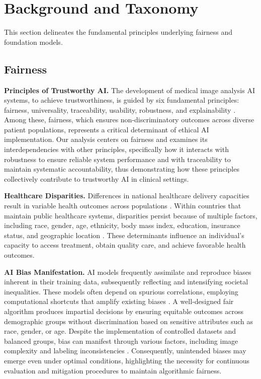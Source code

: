 \section{Background and Taxonomy}
This section delineates the fundamental principles underlying fairness and foundation models.

\subsection{Fairness}
\textbf{Principles of Trustworthy AI.} The development of medical image analysis AI systems, to achieve trustworthiness, is guided by six fundamental principles: fairness, universality, traceability, usability, robustness, and explainability \cite{lekadir_future-ai_2025}. Among these, fairness, which ensures non-discriminatory outcomes across diverse patient populations, represents a critical determinant of ethical AI implementation. Our analysis centers on fairness and examines its interdependencies with other principles, specifically how it interacts with robustness to ensure reliable system performance and with traceability to maintain systematic accountability, thus demonstrating how these principles collectively contribute to trustworthy AI in clinical settings.

\textbf{Healthcare Disparities.} Differences in national healthcare delivery capacities result in variable health outcomes across populations \cite{world_health_organization_conceptual_2010, chen_ethical_2021}. Within countries that maintain public healthcare systems, disparities persist because of multiple factors, including race, gender, age, ethnicity, body mass index, education, insurance status, and geographic location \cite{bailey_structural_2017, williams_understanding_2019}. These determinants influence an individual's capacity to access treatment, obtain quality care, and achieve favorable health outcomes.

\textbf{AI Bias Manifestation.} AI models frequently assimilate and reproduce biases inherent in their training data, subsequently reflecting and intensifying societal inequalities. These models often depend on spurious correlations, employing computational shortcuts that amplify existing biases \cite{geirhos_shortcut_2020, zou_implications_2023, glocker_algorithmic_2023}. A well-designed fair algorithm produces impartial decisions by ensuring equitable outcomes across demographic groups without discrimination based on sensitive attributes such as race, gender, or age. Despite the implementation of controlled datasets and balanced groups, bias can manifest through various factors, including image complexity and labeling inconsistencies \cite{cui_classes_nodate}. Consequently, unintended biases may emerge even under optimal conditions, highlighting the necessity for continuous evaluation and mitigation procedures to maintain algorithmic fairness.


